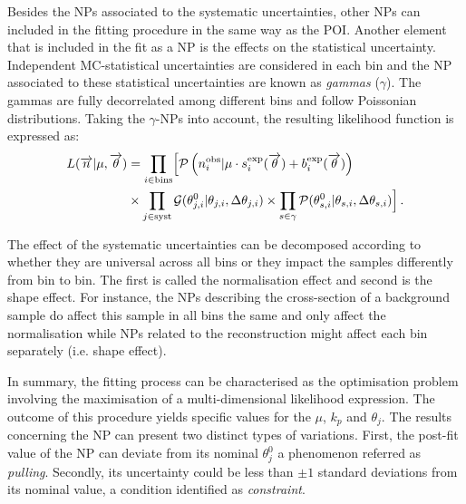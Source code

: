 Besides the NPs associated to the systematic uncertainties, other NPs can included in the 
fitting procedure in the same way as the POI.
Another element that is included in the fit as a NP is the effects on the statistical uncertainty.
Independent MC-statistical uncertainties are considered in each bin and the NP associated
to these statistical uncertainties are known as \textit{gammas} ($\gamma$). 
The gammas are fully decorrelated among different bins and follow Poissonian distributions.
Taking the $\gamma$-NPs into account, the resulting likelihood function is expressed as:
\begin{align}\label{eq:ChaptH:FitWithSyst}
\begin{split}
	L(\overrightarrow{n}|\mu, \overrightarrow{\theta}) 
	& = \prod_{i \in \text{bins}} \Bigl[\mathcal{P}\left(n_{i}^{\text{obs}} | \mu \cdot s_{i}^{\text{exp}}(\overrightarrow{\theta}) + b_{i}^{\text{exp}}(\overrightarrow{\theta})\right) \\
	& \times \prod_{j \in \text{syst}} \mathcal{G}(\theta^{0}_{j,i}|\theta_{j,i}, \Delta \theta_{j,i}) 
	\times \prod_{s \in \gamma} \mathcal{P}(\theta^{0}_{s,i}|\theta_{s,i}, \Delta \theta_{s,i})\Bigr] \, .
\end{split}
\end{align}


The effect of the systematic uncertainties can be decomposed according to whether they are universal across all bins or 
they impact the samples differently from bin to bin. The first is called the normalisation effect and second is the shape effect.
For instance, the NPs describing the cross-section of a background sample do affect this sample in all bins the same
and only affect the normalisation while NPs related to the reconstruction might affect each bin separately (i.e. shape effect).

In summary, the fitting process can be characterised as the optimisation problem involving the 
maximisation of a multi-dimensional likelihood expression. The outcome of this procedure yields 
specific values for the $\mu$, $k_{p}$ and $\theta_{j}$. The results concerning the NP can present
two distinct types of variations. First, the post-fit value of the NP can deviate from its nominal $\theta^{0}_{j}$
a phenomenon referred 
as \textit{pulling}. Secondly, its uncertainty could be less than $\pm 1$ standard deviations from its 
nominal value, a condition identified as \textit{constraint}.



